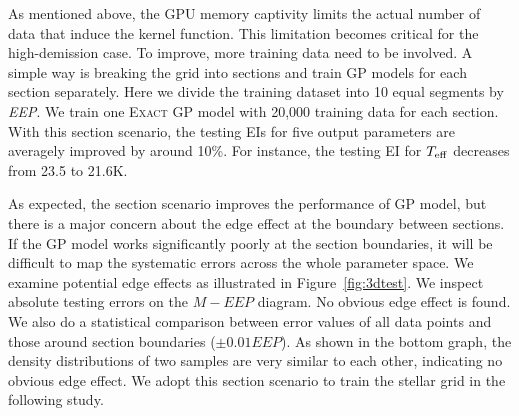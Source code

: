 As mentioned above, the GPU memory captivity limits the actual number of data that induce the kernel function.   
This limitation becomes critical for the high-demission case. To improve, more training data need to be involved. 
%
A simple way is breaking the grid into sections and train GP models for each section separately. 
Here we divide the training dataset into 10 equal segments by {\it EEP}. We train one \textsc{Exact GP} model with 20,000 training data for each section. 
With this section scenario, the testing EIs for five output parameters are averagely improved by around 10\%. For instance, the testing EI for $T_{\rm eff}$ decreases from 23.5 to 21.6K.
%

As expected, the section scenario improves the performance of GP model, but there is a major concern about the edge effect at the boundary between sections. If the GP model works significantly poorly at the section boundaries, it will be difficult to map the systematic errors across the whole parameter space. We examine potential edge effects as illustrated in Figure~\ref{fig:3dtest}. We inspect absolute testing errors on the $M-EEP$ diagram. No obvious edge effect is found. We also do a statistical comparison between error values of all data points and those around section boundaries ($\pm0.01EEP$). As shown in the bottom graph, the density distributions of two samples are very similar to each other, indicating no obvious edge effect. We adopt this section scenario to train the stellar grid in the following study.  



